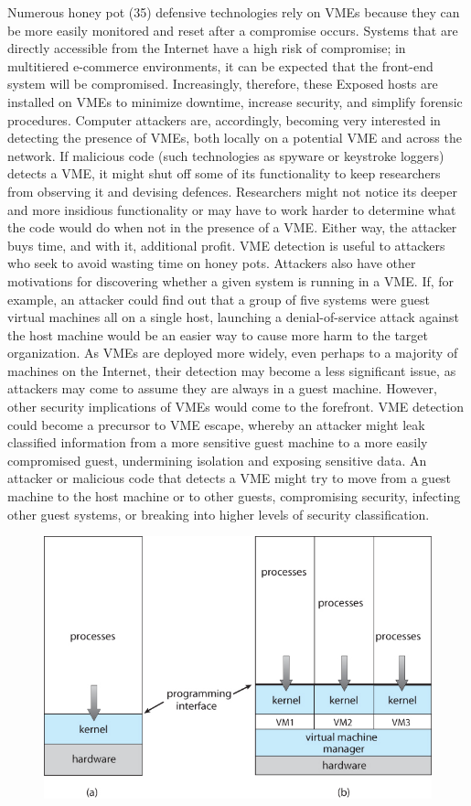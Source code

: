 \documentclass[11pt,a4paper]{article}
\begin{document}
 Numerous honey pot (35) defensive technologies rely on VMEs because they can be more easily monitored and reset after a compromise occurs. Systems that are directly accessible from the Internet have a high risk of compromise; in multitiered e-commerce environments, it can be expected that the front-end system will be compromised. Increasingly, therefore, these Exposed hosts are installed on VMEs to minimize downtime, increase security, and simplify forensic procedures. Computer attackers are, accordingly, becoming very interested in detecting the presence of VMEs, both locally on a potential VME and across the network. If malicious code (such technologies as spyware or keystroke loggers) detects a VME, it might shut off some of its functionality to keep researchers from observing it and devising defences. Researchers might not notice its deeper and more insidious functionality or may have to work harder to determine what the code would do when not in the presence of a VME. Either way, the attacker buys time, and with it, additional profit. VME detection is useful to attackers who seek to avoid wasting time on honey pots. Attackers also have other motivations for discovering whether a given system is running in a VME. If, for example, an attacker could find out that a group of five systems were guest virtual machines all on a single host, launching a denial-of-service attack against the host machine would be an easier way to cause more harm to the target organization. As VMEs are deployed more widely, even perhaps to a majority of machines on the Internet, their detection may become a less significant issue, as attackers may come to assume they are always in a guest machine. However, other security implications of VMEs would come to the forefront. VME detection could become a precursor to VME escape, whereby an attacker might leak classified information from a more sensitive guest machine to a more easily compromised guest, undermining isolation and exposing sensitive data. An attacker or malicious code that detects a VME might try to move from a guest machine to the host machine or to other guests, compromising security, infecting other guest systems, or breaking into higher levels of security classification.\\
\begin{center}
\begin{figure}[h]
			\centering
			\includegraphics[width=10 cm, height= 8 cm]{virtuals.jpg}
\end{figure}
\end{center}
\end{document}
